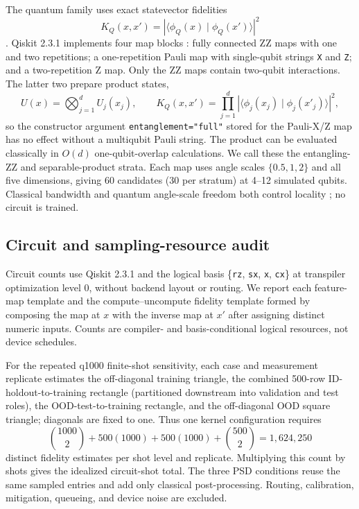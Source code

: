\documentclass[referee,lineno,pdflatex,sn-vancouver-num]{sn-jnl}
\theoremstyle{thmstyleone}%
\theoremstyle{thmstyletwo}%
\theoremstyle{thmstylethree}%
\begin{document}
The quantum family uses exact statevector fidelities
\[
K_Q(x,x')=\left|\langle\phi_Q(x)\mid\phi_Q(x')\rangle\right|^2
\]
\cite{havlicek2019quantumenhanced,schuld2019featurehilbert}. Qiskit 2.3.1 implements four map blocks \cite{javadiabhari2024qiskit}: fully connected ZZ maps with one and two repetitions; a one-repetition Pauli map with single-qubit strings \texttt{X} and \texttt{Z}; and a two-repetition Z map. Only the ZZ maps contain two-qubit interactions. The latter two prepare product states,
\[
U(x)=\bigotimes_{j=1}^{d}U_j(x_j),\qquad
K_Q(x,x')=\prod_{j=1}^{d}
\left|\langle\phi_j(x_j)\mid\phi_j(x'_j)\rangle\right|^2,
\]
so the constructor argument \texttt{entanglement="full"} stored for the Pauli-X/Z map has no effect without a multiqubit Pauli string. The product can be evaluated classically in $O(d)$ one-qubit-overlap calculations. We call these the entangling-ZZ and separable-product strata. Each map uses angle scales $\{0.5,1,2\}$ and all five dimensions, giving 60 candidates (30 per stratum) at 4--12 simulated qubits. Classical bandwidth and quantum angle-scale freedom both control locality \cite{shaydulin2022bandwidth,canatar2023bandwidth}; no circuit is trained.

\subsection{Circuit and sampling-resource audit}

Circuit counts use Qiskit 2.3.1 and the logical basis \{\texttt{rz}, \texttt{sx}, \texttt{x}, \texttt{cx}\} at transpiler optimization level 0, without backend layout or routing. We report each feature-map template and the compute--uncompute fidelity template formed by composing the map at $x$ with the inverse map at $x'$ after assigning distinct numeric inputs. Counts are compiler- and basis-conditional logical resources, not device schedules.

For the repeated q1000 finite-shot sensitivity, each case and measurement replicate estimates the off-diagonal training triangle, the combined 500-row ID-holdout-to-training rectangle (partitioned downstream into validation and test roles), the OOD-test-to-training rectangle, and the off-diagonal OOD square triangle; diagonals are fixed to one. Thus one kernel configuration requires
\[
\binom{1000}{2}+500(1000)+500(1000)+\binom{500}{2}
=1{,}624{,}250
\]
distinct fidelity estimates per shot level and replicate. Multiplying this count by shots gives the idealized circuit-shot total. The three PSD conditions reuse the same sampled entries and add only classical post-processing. Routing, calibration, mitigation, queueing, and device noise are excluded.
\end{document}
